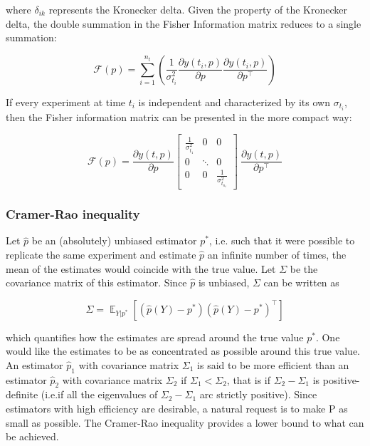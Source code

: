 \documentclass[../Article_Design_of_Experiment.tex]{subfiles}
\begin{document}
	where $\delta_{ik}$ represents the Kronecker delta. Given the property of the Kronecker delta, the double summation in the Fisher Information matrix reduces to a single summation:
	
	{\footnotesize
	\begin{equation}
		\mathcal{F}(p) = \sum_{i=1}^{n_t} \left( \frac{1}{\sigma_{t_i}^2} \frac{\partial y(t_i, p)}{\partial p} \frac{\partial y(t_i, p)}{\partial p^\top} \right)
	\end{equation} }
	
	If every experiment at time $t_i$ is independent and characterized by its own $\sigma_{t_i}$, then the Fisher information matrix can be presented in the more compact way:
	
	{\footnotesize
	\begin{equation}
		\mathcal{F}(p) = \frac{\partial y(t, p)}{\partial p} \begin{bmatrix}
			\frac{1}{\sigma_{t_1}^2} & 0 & 0\\
			0 & \ddots & 0 \\
			0 & 0 & \frac{1}{\sigma_{t_{n_t}}^2} 
		\end{bmatrix}\ \frac{\partial y(t, p)}{\partial p^\top} 
	\end{equation} }
	
	\subsubsection{Cramer-Rao inequality}
	
	Let $\hat{p}$ be an (absolutely) unbiased estimator $p^*$, i.e. such that it were possible to replicate the same experiment and estimate $\hat{p}$ an infinite number of times, the mean of the estimates would coincide with the true value. Let $\Sigma$ be the covariance matrix of this estimator. Since $\hat{p}$ is unbiased, $\Sigma$ can be written as
	
	{\footnotesize
	\begin{equation}
		\Sigma = \mathop{\mathbb{E}}_{Y|p^*} \left[ \left( \hat{p}(Y) - p^* \right) \left( \hat{p}(Y) - p^* \right)^\top \right]
	\end{equation} }
	
	which quantifies how the estimates are spread around the true value $p^*$. One would like the estimates to be as concentrated as possible around this true value. An estimator $\hat{p}_1$ with covariance matrix $\Sigma_1$ is said to be more efficient than an estimator $\hat{p}_2$ with covariance matrix $\Sigma_2$ if $\Sigma_1 < \Sigma_2$, that is if $\Sigma_2 - \Sigma_1$ is positive-definite (i.e.if all the eigenvalues of $\Sigma_2-\Sigma_1$ arc strictly positive). Since estimators with high efficiency are desirable, a natural request is to make P as small as possible. The Cramer-Rao inequality provides a lower bound to what can be achieved.
	
\end{document}
